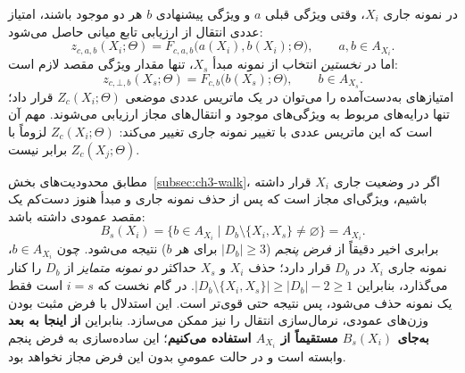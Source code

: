 در نمونه جاری $X_i$، وقتی ویژگی قبلی $a$ و ویژگی پیشنهادی $b$
هر دو موجود باشند، امتیاز عددی انتقال از ارزیابی تابع میانی حاصل می‌شود:
\begin{equation}\label{eq:ch3-parametric-feature-score}
\boxed{
z_{c,a,b}(X_i;\Theta)=
F_{c,a,b}\bigl(a(X_i),b(X_i);\Theta\bigr),
\qquad a,b\in A_{X_i}.
}
\end{equation}
اما در \emph{نخستین} انتخاب از نمونه مبدأ $X_s$، تنها مقدار ویژگی مقصد
لازم است:
\begin{equation}\label{eq:ch3-parametric-start-score}
\boxed{
z_{c,\bot,b}(X_s;\Theta)=F_{c,b}\bigl(b(X_s);\Theta\bigr),
\qquad b\in A_{X_s}.
}
\end{equation}
امتیازهای به‌دست‌آمده را می‌توان در یک ماتریس عددی موضعی
$Z_{c}(X_i;\Theta)$ قرار داد؛ تنها درایه‌های مربوط به ویژگی‌های موجود
و انتقال‌های مجاز ارزیابی می‌شوند. مهم آن است که این ماتریس عددی
با تغییر نمونه جاری تغییر می‌کند: $Z_{c}(X_i;\Theta)$ لزوماً
با $Z_{c}(X_j;\Theta)$ برابر نیست.

مطابق محدودیت‌های بخش~\ref{subsec:ch3-walk}،
اگر در وضعیت جاری $X_i$ قرار داشته باشیم،
ویژگی‌ای مجاز است که پس از حذف نمونه جاری و مبدأ
هنوز دست‌کم یک مقصد عمودی داشته باشد:
\begin{equation}\label{eq:ch3-feature-eligibility}
B_s(X_i)=\bigl\{b\in A_{X_i}\mid
D_b\setminus\{X_i,X_s\}\ne\varnothing\bigr\}
=A_{X_i}.
\end{equation}
برابری اخیر دقیقاً از \emph{فرض پنجم}
($|D_b|\ge3$ برای هر $b$) نتیجه می‌شود.
چون $b\in A_{X_i}$، نمونه جاری $X_i$ در $D_b$ قرار دارد؛
حذف $X_i$ و $X_s$ حداکثر \emph{دو نمونه متمایز}
از $D_b$ را کنار می‌گذارد، بنابراین
$\bigl|D_b\setminus\{X_i,X_s\}\bigr|
\ge |D_b|-2\ge1$.
در گام نخست که $i=s$ است فقط یک نمونه حذف می‌شود،
پس نتیجه حتی قوی‌تر است. این استدلال با فرض مثبت بودن
وزن‌های عمودی، نرمال‌سازی انتقال را نیز ممکن می‌سازد.
بنابراین \textbf{از اینجا به بعد به‌جای $B_s(X_i)$
مستقیماً از $A_{X_i}$ استفاده می‌کنیم}؛
این ساده‌سازی به فرض پنجم وابسته است و
در حالت عمومیِ بدون این فرض مجاز نخواهد بود.

